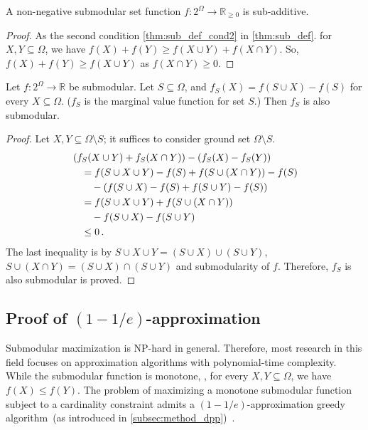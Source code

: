 \begin{lemma}\label{thm:sub_additive}
	A non-negative submodular set function $f: 2^{\Omega}\rightarrow\mathbb{R}_{\geq 0}$ is sub-additive.
	\begin{proof}
		As the second condition \cref{thm:sub_def_cond2} in \cref{thm:sub_def}. 
		for $X,Y\subseteq \Omega$, we have $f(X) + f(Y) \geq f(X \cup Y) + f(X \cap Y)$. So, $f(X) + f(Y) \geq f(X \cup Y)$ as $f(X \cap Y) \geq 0$.
	\end{proof}
\end{lemma}

\begin{lemma}\label{thm:fs_submodular}
	Let $f: 2^{\Omega}\rightarrow \mathbb{R}$ be submodular. 
	Let $S\subseteq \Omega$, and $f_{S}(X)=f(S\cup X)-f(S)$ for every $X\subseteq\Omega$. ($f_{S}$ is the marginal value function for set $S$.) 
	Then $f_S$ is also submodular.
	\begin{proof}
		Let $X, Y\subseteq\Omega \setminus S$; it suffices to consider ground set $\Omega\setminus S$.
		\begin{align}
			&\left(f_S(X\cup Y)+f_S(X\cap Y)\right)-\left(f_S(X)-f_S(Y)\right) \notag\\
			&\quad=f(S\cup X\cup Y)-f(S)+f(S\cup(X\cap Y))-f(S) \notag\\
			&\qquad-\left(f(S\cup X)-f(S)+f(S\cup Y)-f(S)\right) \\
			&\quad = f(S\cup X\cup Y)+f(S\cup(X\cap Y)) \notag\\
			&\qquad-f(S\cup X)-f(S\cup Y) \notag\\
			&\quad \leq 0 \,. \notag
		\end{align}
		The last inequality is by $S\cup X\cup Y=(S\cup X)\cup(S\cup Y)$, $S\cup(X\cap Y)=(S\cup X)\cap(S\cup Y)$ and submodularity of $f$.
		Therefore, $f_S$ is also submodular is proved.
	\end{proof}
\end{lemma}

\subsection{Proof of $(1-1/e)$-approximation}

Submodular maximization is NP-hard in general.
Therefore, most research in this field focuses on approximation algorithms with polynomial-time complexity. 
While the submodular function is monotone, \ie, for every $X, Y \subseteq \Omega$, we have $f(X) \leq f(Y)$. 
The problem of maximizing a monotone submodular function subject to a cardinality constraint admits a $(1 - 1/e)$-approximation greedy algorithm~(as introduced  in \cref{subsec:method_dpp})~\cite{nemhauser1978analysis}.

